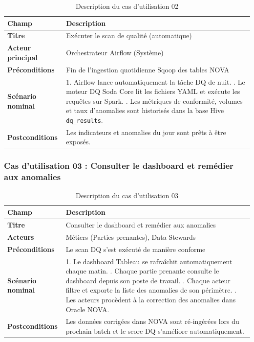 \begin{table}[H]
\centering
\caption{Description du cas d'utilisation 02}
\label{tab:uc02}
\renewcommand{\arraystretch}{1.4}
\begin{tabular}{|l|p{10cm}|}
\hline
\rowcolor{gray!20}
\textbf{Champ} & \textbf{Description} \\
\hline
\textbf{Titre} & Exécuter le scan de qualité (automatique) \\
\hline
\textbf{Acteur principal} & Orchestrateur Airflow (Système) \\
\hline
\textbf{Préconditions} & Fin de l'ingestion quotidienne Sqoop des tables NOVA \\
\hline
\textbf{Scénario nominal} &
1. Airflow lance automatiquement la tâche DQ de nuit. \newline
2. Le moteur DQ Soda Core lit les fichiers YAML et exécute les requêtes sur Spark. \newline
3. Les métriques de conformité, volumes et taux d'anomalies sont historisés dans la base Hive \texttt{dq\_results}. \\
\hline
\textbf{Postconditions} & Les indicateurs et anomalies du jour sont prêts à être exposés. \\
\hline
\end{tabular}
\end{table}

\subsubsection{Cas d'utilisation 03 : Consulter le dashboard et remédier aux anomalies}

\begin{table}[H]
\centering
\caption{Description du cas d'utilisation 03}
\label{tab:uc03}
\renewcommand{\arraystretch}{1.4}
\begin{tabular}{|l|p{10cm}|}
\hline
\rowcolor{gray!20}
\textbf{Champ} & \textbf{Description} \\
\hline
\textbf{Titre} & Consulter le dashboard et remédier aux anomalies \\
\hline
\textbf{Acteurs} & Métiers (Parties prenantes), Data Stewards \\
\hline
\textbf{Préconditions} & Le scan DQ s'est exécuté de manière conforme \\
\hline
\textbf{Scénario nominal} &
1. Le dashboard Tableau se rafraîchit automatiquement chaque matin. \newline
2. Chaque partie prenante consulte le dashboard depuis son poste de travail. \newline
3. Chaque acteur filtre et exporte la liste des anomalies de son périmètre. \newline
4. Les acteurs procèdent à la correction des anomalies dans Oracle NOVA. \\
\hline
\textbf{Postconditions} & Les données corrigées dans NOVA sont ré-ingérées lors du prochain batch et le score DQ s'améliore automatiquement. \\
\hline
\end{tabular}
\end{table}

